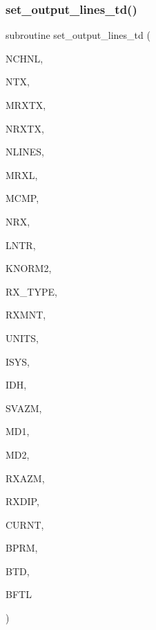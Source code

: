 \mbox{\label{Leroi__c_8f90_a2a5820b2a223f63d10cd7fe63469c604}} 
\subsubsection{\texorpdfstring{set\+\_\+output\+\_\+lines\+\_\+td()}{set\_output\_lines\_td()}}
{\footnotesize\ttfamily subroutine set\+\_\+output\+\_\+lines\+\_\+td (\begin{DoxyParamCaption}\item[{integer}]{N\+C\+H\+NL,  }\item[{integer}]{N\+TX,  }\item[{integer}]{M\+R\+X\+TX,  }\item[{integer, dimension(ntx)}]{N\+R\+X\+TX,  }\item[{integer}]{N\+L\+I\+N\+ES,  }\item[{integer}]{M\+R\+XL,  }\item[{integer}]{M\+C\+MP,  }\item[{integer, dimension(nlines)}]{N\+RX,  }\item[{integer, dimension(4,nlines)}]{L\+N\+TR,  }\item[{integer, dimension(mrxtx,ntx)}]{K\+N\+O\+R\+M2,  }\item[{integer, dimension(nlines)}]{R\+X\+\_\+\+T\+Y\+PE,  }\item[{real, dimension(nlines)}]{R\+X\+M\+NT,  }\item[{integer, dimension(nlines)}]{U\+N\+I\+TS,  }\item[{integer}]{I\+S\+YS,  }\item[{integer, dimension(nlines)}]{I\+DH,  }\item[{real, dimension(nlines)}]{S\+V\+A\+ZM,  }\item[{integer}]{M\+D1,  }\item[{integer}]{M\+D2,  }\item[{real, dimension(md1,md2)}]{R\+X\+A\+ZM,  }\item[{real, dimension(md1,md2)}]{R\+X\+D\+IP,  }\item[{real, dimension(1)}]{C\+U\+R\+NT,  }\item[{real, dimension(mrxtx,ntx)}]{B\+P\+RM,  }\item[{real, dimension(nchnl,mrxtx,ntx,3)}]{B\+TD,  }\item[{real, dimension(nchnl,mrxl,mcmp,nlines)}]{B\+F\+TL }\end{DoxyParamCaption})}

